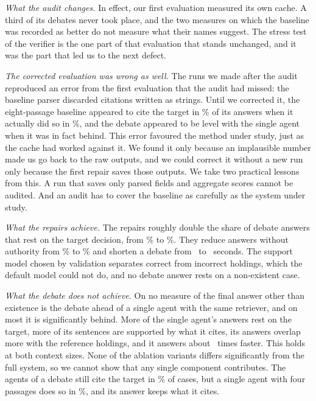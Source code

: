 \documentclass[conference]{IEEEtran}
\begin{document}
\emph{What the audit changes.} In effect, our first evaluation measured its own cache. A third of its debates never took place, and the two measures on which the baseline was recorded as better do not measure what their names suggest. The stress test of the verifier is the one part of that evaluation that stands unchanged, and it was the part that led us to the next defect.

\emph{The corrected evaluation was wrong as well.} The runs we made after the audit reproduced an error from the first evaluation that the audit had missed: the baseline parser discarded citations written as strings. Until we corrected it, the eight-passage baseline appeared to cite the target in \ResParseBaseEightTargetAsSaved\% of its answers when it actually did so in \ResPaBaseEightTargetAnswer\%, and the debate appeared to be level with the single agent when it was in fact behind. This error favoured the method under study, just as the cache had worked against it. We found it only because an implausible number made us go back to the raw outputs, and we could correct it without a new run only because the first repair saves those outputs. We take two practical lessons from this. A run that saves only parsed fields and aggregate scores cannot be audited. And an audit has to cover the baseline as carefully as the system under study.

\emph{What the repairs achieve.} The repairs roughly double the share of debate answers that rest on the target decision, from \ResPaOldTargetAnswer\% to \ResPaFinalTargetAnswer\%. They reduce answers without authority from \ResPaOldNoAuthority\% to \ResPaFinalNoAuthority\% and shorten a debate from \ResPaOldSecondsPerCase\ to \ResPaFinalSecondsPerCase\ seconds. The support model chosen by validation separates correct from incorrect holdings, which the default model could not do, and no debate answer rests on a non-existent case.

\emph{What the debate does not achieve.} On no measure of the final answer other than existence is the debate ahead of a single agent with the same retriever, and on most it is significantly behind. More of the single agent's answers rest on the target, more of its sentences are supported by what it cites, its answers overlap more with the reference holdings, and it answers about \ResPaFinalTimeRatio\ times faster. This holds at both context sizes. None of the ablation variants differs significantly from the full system, so we cannot show that any single component contributes. The agents of a debate still cite the target in \ResPaFinalTargetAny\% of cases, but a single agent with four passages does so in \ResPaBaseFourRTargetAny\%, and its answer keeps what it cites.
\end{document}

